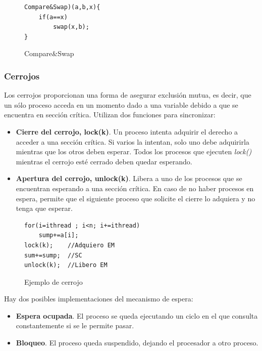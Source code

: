 \documentclass[12pt,spanish]{article}
\begin{document}
\begin{figure}[H]
\centering
\begin{verbatim}
Compare&Swap)(a,b,x){
	if(a==x)
		swap(x,b);
}
\end{verbatim}
\caption{Compare\&Swap}
\end{figure}



\subsubsection{Cerrojos}

Los cerrojos proporcionan una forma de asegurar exclusión mutua, es decir, que un sólo proceso acceda en un momento dado a una variable debido a que se encuentra en sección crítica. Utilizan dos funciones para sincronizar:
\begin{itemize}
	\item \textbf{Cierre del cerrojo, lock(k)}. Un proceso intenta adquirir el derecho a acceder a una sección crítica. Si varios la intentan, solo uno debe adquirirla mientras que los otros deben esperar. Todos los procesos que ejecuten \emph{lock()} mientras el cerrojo esté cerrado deben quedar esperando.
	\item \textbf{Apertura del cerrojo, unlock(k)}. Libera a uno de los procesos que se encuentran esperando a una sección crítica. En caso de no haber procesos en espera, permite que el siguiente proceso que solicite el cierre lo adquiera y no tenga que esperar.
\end{itemize}

\begin{figure}[H]
\centering
\begin{verbatim}
for(i=ithread ; i<n; i+=ithread)
	sump+=a[i];
lock(k);	//Adquiero EM
sum+=sump;	//SC
unlock(k);	//Libero EM
\end{verbatim}
\caption{Ejemplo de cerrojo}
\end{figure}

Hay dos posibles implementaciones del mecanismo de espera:

\begin{itemize}
	\item \textbf{Espera ocupada}. El proceso se queda ejecutando un ciclo en el que consulta constantemente si se le permite pasar.
	\item \textbf{Bloqueo}. El proceso queda suspendido, dejando el procesador a otro proceso.
\end{itemize}
\end{document}
